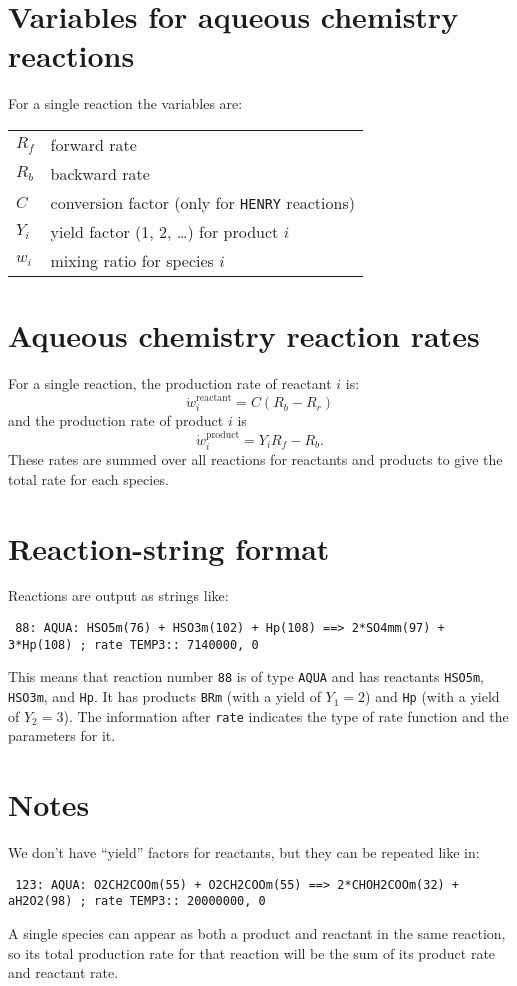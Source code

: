 \documentclass{article}
\begin{document}
\section{Variables for aqueous chemistry reactions}

For a single reaction the variables are:

\begin{tabular}{ll}
  $R_f$ & forward rate \\
  $R_b$ & backward rate \\
  $C$ & conversion factor (only for \texttt{HENRY} reactions) \\
  $Y_i$ & yield factor (1, 2, \ldots) for product $i$ \\
  $w_i$ & mixing ratio for species $i$
\end{tabular}

\section{Aqueous chemistry reaction rates}

For a single reaction, the production rate of reactant $i$ is:
\begin{equation}
  \dot{w}_i^{\text{reactant}} = C(R_b - R_r)
\end{equation}
and the production rate of product $i$ is
\begin{equation}
  \dot{w}_i^{\text{product}} = Y_i R_f - R_b.
\end{equation}
These rates are summed over all reactions for reactants and products
to give the total rate for each species.

\section{Reaction-string format}

Reactions are output as strings like:
\begin{verbatim}
 88: AQUA: HSO5m(76) + HSO3m(102) + Hp(108) ==> 2*SO4mm(97) + 3*Hp(108) ; rate TEMP3:: 7140000, 0
\end{verbatim}
This means that reaction number \texttt{88} is of type \texttt{AQUA}
and has reactants \texttt{HSO5m}, \texttt{HSO3m}, and \texttt{Hp}. It
has products \texttt{BRm} (with a yield of $Y_1 = 2$) and \texttt{Hp}
(with a yield of $Y_2 = 3$). The information after \texttt{rate}
indicates the type of rate function and the parameters for it.

\section{Notes}

We don't have ``yield'' factors for reactants, but they can be
repeated like in:
\begin{verbatim}
 123: AQUA: O2CH2COOm(55) + O2CH2COOm(55) ==> 2*CHOH2COOm(32) + aH2O2(98) ; rate TEMP3:: 20000000, 0
\end{verbatim}

A single species can appear as both a product and reactant in the same
reaction, so its total production rate for that reaction will be the
sum of its product rate and reactant rate.
\end{document}
